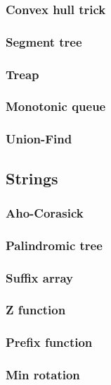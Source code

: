 \documentclass[landscape,a4paper,twocolumn,10pt]{report}
\begin{document}
\subsubsection*{Convex hull trick}

\subsubsection*{Segment tree}

\subsubsection*{Treap}

\subsubsection*{Monotonic queue}

\subsubsection*{Union-Find}


\newpage
\subsection*{Strings}
\subsubsection*{Aho-Corasick}

\subsubsection*{Palindromic tree}

\subsubsection*{Suffix array}

\subsubsection*{Z function}

\subsubsection*{Prefix function}

\subsubsection*{Min rotation}

\end{document}
